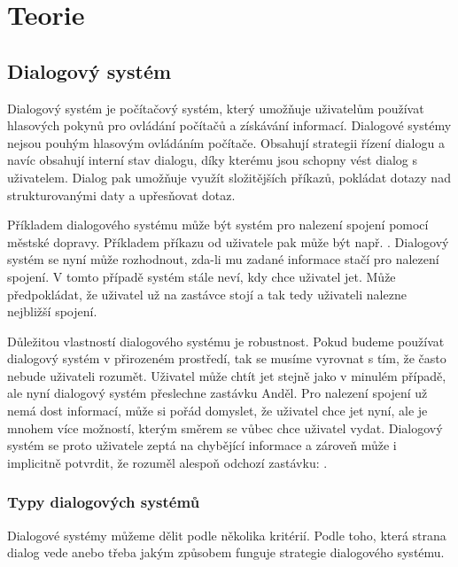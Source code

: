 \chapter{Teorie}

\section{Dialogový systém}

Dialogový systém je počítačový systém, který umožňuje uživatelům používat
hlasových pokynů pro ovládání počítačů a získávání informací. Dialogové systémy
nejsou pouhým hlasovým ovládáním počítače. Obsahují strategii řízení dialogu a
navíc obsahují interní stav dialogu, díky kterému jsou schopny vést dialog s
uživatelem. Dialog pak umožňuje využít složitějších příkazů, pokládat dotazy
nad strukturovanými daty a upřesňovat dotaz.

Příkladem dialogového systému může být systém pro nalezení spojení pomocí
městské dopravy. Příkladem příkazu od uživatele pak může být např. . Dialogový systém se nyní může rozhodnout,
zda-li mu zadané informace stačí pro nalezení spojení. V tomto případě systém
stále neví, kdy chce uživatel jet. Může předpokládat, že uživatel už na
zastávce stojí a tak tedy uživateli nalezne nejbližší spojení.

Důležitou vlastností dialogového systému je robustnost. Pokud budeme používat
dialogový systém v přirozeném prostředí, tak se musíme vyrovnat s tím, že často
nebude uživateli rozumět. Uživatel může chtít jet stejně jako v minulém
případě, ale nyní dialogový systém přeslechne zastávku Anděl. Pro nalezení
spojení už nemá dost informací, může si pořád domyslet, že uživatel chce jet
nyní, ale je mnohem více možností, kterým směrem se vůbec chce uživatel vydat.
Dialogový systém se proto uživatele zeptá na chybějící informace a zároveň může
i implicitně potvrdit, že rozuměl alespoň odchozí zastávku: .

\subsection{Typy dialogových systémů}

Dialogové systémy můžeme dělit podle několika kritérií. Podle toho, která
strana dialog vede anebo třeba jakým způsobem funguje strategie dialogového
systému.

